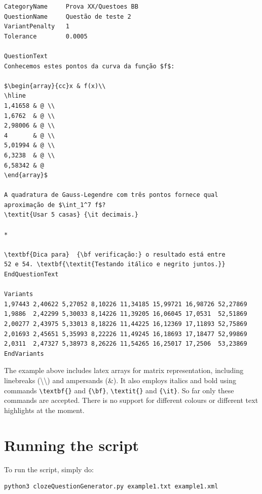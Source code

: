 \documentclass[11pt]{article}
\begin{document}
\begin{verbatim}
CategoryName     Prova XX/Questoes BB
QuestionName     Questão de teste 2
VariantPenalty   1
Tolerance        0.0005

QuestionText
Conhecemos estes pontos da curva da função $f$:

$\begin{array}{cc}x & f(x)\\ 
\hline 
1,41658 & @ \\ 
1,6762  & @ \\ 
2,98006 & @ \\ 
4       & @ \\ 
5,01994 & @ \\ 
6,3238  & @ \\ 
6,58342 & @
\end{array}$

A quadratura de Gauss-Legendre com três pontos fornece qual aproximação de $\int_1^7 f$? 
\textit{Usar 5 casas} {\it decimais.}

*

\textbf{Dica para}  {\bf verificação:} o resultado está entre 
52 e 54. \textbf{\textit{Testando itálico e negrito juntos.}}
EndQuestionText

Variants
1,97443 2,40622 5,27052 8,10226 11,34185 15,99721 16,98726 52,27869
1,9886  2,42299 5,30033 8,14226 11,39205 16,06045 17,0531  52,51869
2,00277 2,43975 5,33013 8,18226 11,44225 16,12369 17,11893 52,75869
2,01693 2,45651 5,35993 8,22226 11,49245 16,18693 17,18477 52,99869
2,0311  2,47327 5,38973 8,26226 11,54265 16,25017 17,2506  53,23869
EndVariants
\end{verbatim}

The example above includes latex arrays for matrix representation, including linebreaks (\textbackslash\textbackslash) and ampersands (\&). It also employs italics and bold using commands \texttt{\textbackslash textbf\{\}} and \texttt{\{\textbackslash bf\}}, \texttt{\textbackslash textit\{\}} and \texttt{\{\textbackslash it\}}. So far only these commands are accepted. There is no support for different colours or different text highlights at the moment.

\section{Running the script}

To run the script, simply do:

\begin{verbatim}
python3 clozeQuestionGenerator.py example1.txt example1.xml
\end{verbatim}
\end{document}
